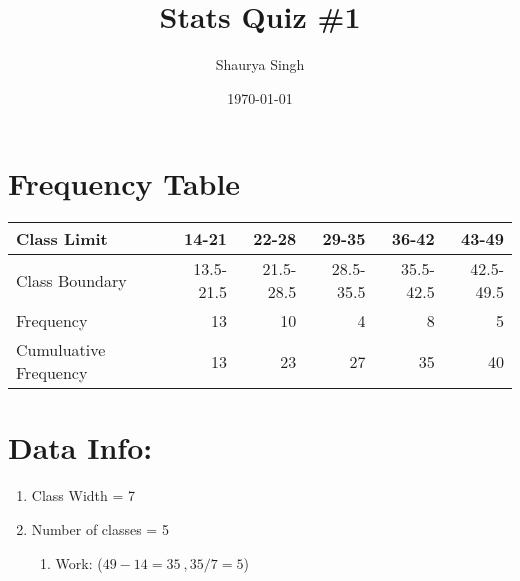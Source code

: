 \documentclass[11pt]{article}
\author{Shaurya Singh}
\date{\today}
\title{Stats Quiz \#1}
\begin{document}
\maketitle

\section{Frequency Table}
\label{sec:orgee27c09}
\begin{center}
\begin{tabular}{lrrrrr}
Class Limit & 14-21 & 22-28 & 29-35 & 36-42 & 43-49\\
\hline
Class Boundary & 13.5-21.5 & 21.5-28.5 & 28.5-35.5 & 35.5-42.5 & 42.5-49.5\\
\hline
Frequency & 13 & 10 & 4 & 8 & 5\\
\hline
Cumuluative Frequency & 13 & 23 & 27 & 35 & 40\\
\end{tabular}
\end{center}

\section{Data Info:}
\label{sec:orgba3db10}
\begin{enumerate}
\item Class Width = 7
\item Number of classes = 5
\begin{enumerate}
\item Work: (\(49-14=35\ ,35/7=5\))
\end{enumerate}
\end{enumerate}
\end{document}
